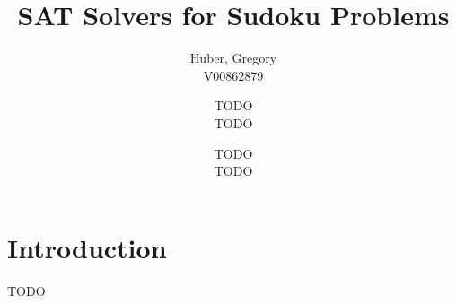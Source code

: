 \documentclass[12pt]{article}
\title{SAT Solvers for Sudoku Problems}
\author{
  Huber, Gregory \\
  V00862879
  \and
  TODO \\
  TODO
  \and
  TODO \\
  TODO
}
\begin{document}
\maketitle

\section{Introduction}

TODO
\end{document}

